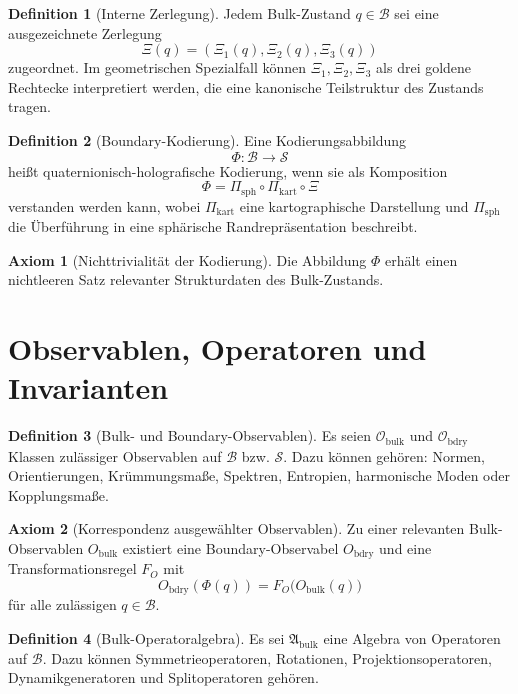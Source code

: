 \documentclass[11pt,a4paper]{article}
\theoremstyle{definition}
\newtheorem{definition}{Definition}
\newtheorem{axiom}{Axiom}
\theoremstyle{remark}
\begin{document}
\begin{definition}[Interne Zerlegung]
Jedem Bulk-Zustand $q\in\mathcal{B}$ sei eine ausgezeichnete Zerlegung
\[
\Xi(q)=(\Xi_1(q),\Xi_2(q),\Xi_3(q))
\]
zugeordnet. Im geometrischen Spezialfall können $\Xi_1,\Xi_2,\Xi_3$ als drei goldene Rechtecke interpretiert werden, die eine kanonische Teilstruktur des Zustands tragen.
\end{definition}

\begin{definition}[Boundary-Kodierung]
Eine Kodierungsabbildung
\[
\Phi:\mathcal{B}\to\mathcal{S}
\]
heißt quaternionisch-holografische Kodierung, wenn sie als Komposition
\[
\Phi=\Pi_{\mathrm{sph}}\circ\Pi_{\mathrm{kart}}\circ\Xi
\]
verstanden werden kann, wobei $\Pi_{\mathrm{kart}}$ eine kartographische Darstellung und $\Pi_{\mathrm{sph}}$ die Überführung in eine sphärische Randrepräsentation beschreibt.
\end{definition}

\begin{axiom}[Nichttrivialität der Kodierung]
Die Abbildung $\Phi$ erhält einen nichtleeren Satz relevanter Strukturdaten des Bulk-Zustands.
\end{axiom}

\section{Observablen, Operatoren und Invarianten}

\begin{definition}[Bulk- und Boundary-Observablen]
Es seien $\mathcal{O}_{\mathrm{bulk}}$ und $\mathcal{O}_{\mathrm{bdry}}$ Klassen zulässiger Observablen auf $\mathcal{B}$ bzw. $\mathcal{S}$. Dazu können gehören: Normen, Orientierungen, Krümmungsmaße, Spektren, Entropien, harmonische Moden oder Kopplungsmaße.
\end{definition}

\begin{axiom}[Korrespondenz ausgewählter Observablen]
Zu einer relevanten Bulk-Observablen $O_{\mathrm{bulk}}$ existiert eine Boundary-Observabel $O_{\mathrm{bdry}}$ und eine Transformationsregel $F_O$ mit
\[
O_{\mathrm{bdry}}(\Phi(q))=F_O\bigl(O_{\mathrm{bulk}}(q)\bigr)
\]
für alle zulässigen $q\in\mathcal{B}$.
\end{axiom}

\begin{definition}[Bulk-Operatoralgebra]
Es sei $\mathfrak{A}_{\mathrm{bulk}}$ eine Algebra von Operatoren auf $\mathcal{B}$. Dazu können Symmetrieoperatoren, Rotationen, Projektionsoperatoren, Dynamikgeneratoren und Splitoperatoren gehören.
\end{definition}
\end{document}
